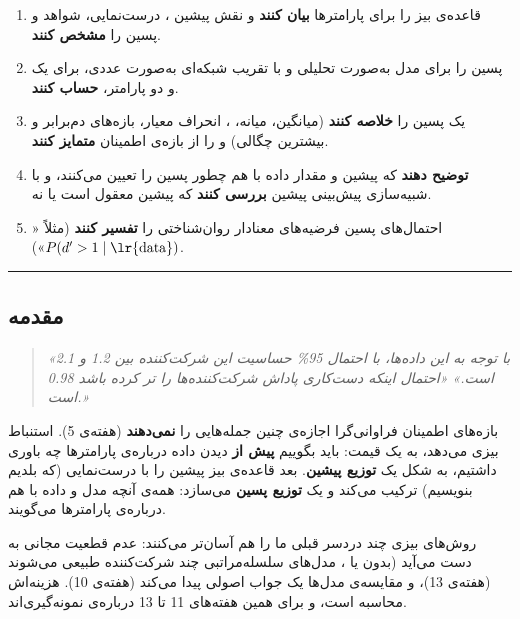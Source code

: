 \begin{enumerate}
\def\labelenumi{\arabic{enumi}.}
\tightlist
\item
  قاعده‌ی بیز را برای پارامترها \textbf{بیان کنند} و نقش پیشین
  ، درست‌نمایی، شواهد  و پسین 
  را \textbf{مشخص کنند}.
\item
  پسین را برای مدل  به‌صورت تحلیلی و با تقریب شبکه‌ای
  به‌صورت عددی، برای یک و دو پارامتر، \textbf{حساب کنند}.
\item
  یک پسین را \textbf{خلاصه کنند} (میانگین، میانه، ، انحراف
  معیار، بازه‌های دم‌برابر و بیشترین چگالی) و  را از
  بازه‌ی اطمینان \textbf{متمایز کنند}.
\item
  \textbf{توضیح دهند} که پیشین و مقدار داده با هم چطور پسین را تعیین
  می‌کنند، و با شبیه‌سازی پیش‌بینی پیشین \textbf{بررسی کنند} که پیشین معقول
  است یا نه.
\item
  احتمال‌های پسین فرضیه‌های معنادار روان‌شناختی را \textbf{تفسیر کنند}
  (مثلاً «\(P(d' > 1 \mid \text{\lr{data}})\)»).
\end{enumerate}

\begin{center}\rule{0.5\linewidth}{0.5pt}\end{center}

\subsection{مقدمه}

\begin{quote}
\emph{«با توجه به این داده‌ها، با احتمال 95\% حساسیت این شرکت‌کننده بین
1.2 و 2.1 است.»} \emph{«احتمال اینکه دست‌کاری پاداش شرکت‌کننده‌ها را
تر کرده باشد 0.98 است.»}
\end{quote}

بازه‌های اطمینان فراوانی‌گرا اجازه‌ی چنین جمله‌هایی را \textbf{نمی‌دهند}
(هفته‌ی 5). استنباط بیزی می‌دهد، به یک قیمت: باید بگوییم \textbf{پیش از}
دیدن داده درباره‌ی پارامترها چه باوری داشتیم، به شکل یک \textbf{توزیع
پیشین}. بعد قاعده‌ی بیز پیشین را با درست‌نمایی (که بلدیم بنویسیم) ترکیب
می‌کند و یک \textbf{توزیع پسین} می‌سازد: همه‌ی آنچه مدل و داده با هم
درباره‌ی پارامترها می‌گویند.

روش‌های بیزی چند دردسر قبلی ما را هم آسان‌تر می‌کنند: عدم قطعیت مجانی به
دست می‌آید (بدون  یا ، مدل‌های سلسله‌مراتبی چند
شرکت‌کننده طبیعی می‌شوند (هفته‌ی 13)، و مقایسه‌ی مدل‌ها یک جواب اصولی پیدا
می‌کند (هفته‌ی 10). هزینه‌اش محاسبه است، و برای همین هفته‌های 11 تا 13
درباره‌ی نمونه‌گیری‌اند.

